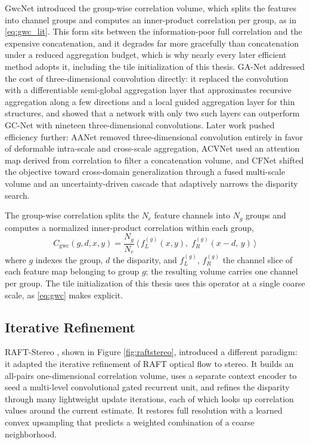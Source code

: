 GwcNet \cite{guo2019gwcnet} introduced the group-wise correlation
volume, which splits the features into channel groups and computes an
inner-product correlation per group, as in \eqref{eq:gwc_lit}. This form
sits between the information-poor full correlation and the expensive
concatenation, and it degrades far more gracefully than concatenation
under a reduced aggregation budget, which is why nearly every later
efficient method adopts it, including the tile initialization of this
thesis. GA-Net \cite{zhang2019ganet} addressed the cost of
three-dimensional convolution directly: it replaced the convolution with
a differentiable semi-global aggregation layer that approximates
recursive aggregation along a few directions and a local guided
aggregation layer for thin structures, and showed that a network with
only two such layers can outperform GC-Net with nineteen
three-dimensional convolutions. Later work pushed efficiency further:
AANet \cite{xu2020aanet} removed
three-dimensional convolution entirely in favor of deformable intra-scale
and cross-scale aggregation, ACVNet \cite{xu2022acvnet} used an
attention map derived from correlation to filter a concatenation volume,
and CFNet \cite{shen2021cfnet} shifted the objective toward cross-domain
generalization through a fused multi-scale volume and an
uncertainty-driven cascade that adaptively narrows the disparity search.

The group-wise correlation splits the $N_c$ feature channels into $N_g$
groups and computes a normalized inner-product correlation within each
group,
\begin{equation}
C_{\mathrm{gwc}}(g, d, x, y) = \frac{N_g}{N_c}\,
  \big\langle\, f_L^{(g)}(x, y),\; f_R^{(g)}(x - d,\, y) \,\big\rangle
\label{eq:gwc_lit}
\end{equation}
where $g$ indexes the group, $d$ the disparity, and $f_L^{(g)}$,
$f_R^{(g)}$ the channel slice of each feature map belonging to group $g$;
the resulting volume carries one channel per group. The tile
initialization of this thesis uses this operator at a single coarse scale,
as \eqref{eq:gwc} makes explicit.

\FloatBarrier
\subsection{Iterative Refinement}
RAFT-Stereo \cite{lipson2021raftstereo}, shown in Figure
\ref{fig:raftstereo}, introduced a different paradigm: it adapted the
iterative refinement of RAFT optical flow to stereo. It builds an all-pairs
one-dimensional correlation volume, uses a separate context encoder to
seed a multi-level convolutional gated recurrent unit, and refines the
disparity through many lightweight update iterations, each of which looks
up correlation values around the current estimate. It restores full
resolution with a learned convex upsampling that predicts a weighted
combination of a coarse neighborhood.

